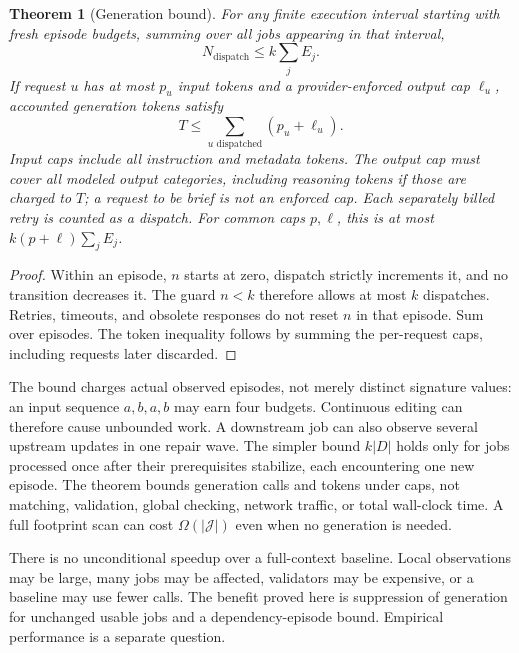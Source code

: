\documentclass[pdflatex,sn-mathphys-num]{sn-jnl}
\theoremstyle{thmstyleone}
\newtheorem{theorem}{Theorem}
\theoremstyle{thmstylethree}
\theoremstyle{thmstyletwo}
\newcommand{\Jobs}{\mathcal J}
\begin{document}
\begin{theorem}[Generation bound]\label{thm:cost}
For any finite execution interval starting with fresh episode budgets, summing over all jobs appearing in that interval,
\begin{equation}\label{eq:calls}
N_{\mathrm{dispatch}}\leq k\sum_j E_j.
\end{equation}
If request $u$ has at most $p_u$ input tokens and a provider-enforced output cap $\ell_u$, accounted generation tokens satisfy
\begin{equation}\label{eq:tokens}
T\leq\sum_{u\text{ dispatched}}(p_u+\ell_u).
\end{equation}
Input caps include all instruction and metadata tokens. The output cap must cover all modeled output categories, including reasoning tokens if those are charged to $T$; a request to be brief is not an enforced cap. Each separately billed retry is counted as a dispatch. For common caps $p,\ell$, this is at most $k(p+\ell)\sum_jE_j$.
\end{theorem}
\begin{proof}
Within an episode, $n$ starts at zero, dispatch strictly increments it, and no transition decreases it. The guard $n<k$ therefore allows at most $k$ dispatches. Retries, timeouts, and obsolete responses do not reset $n$ in that episode. Sum over episodes. The token inequality follows by summing the per-request caps, including requests later discarded.\qedhere
\end{proof}

The bound charges actual observed episodes, not merely distinct signature values: an input sequence $a,b,a,b$ may earn four budgets. Continuous editing can therefore cause unbounded work. A downstream job can also observe several upstream updates in one repair wave. The simpler bound $k|D|$ holds only for jobs processed once after their prerequisites stabilize, each encountering one new episode. The theorem bounds generation calls and tokens under caps, not matching, validation, global checking, network traffic, or total wall-clock time. A full footprint scan can cost $\Omega(|\Jobs|)$ even when no generation is needed.

There is no unconditional speedup over a full-context baseline. Local observations may be large, many jobs may be affected, validators may be expensive, or a baseline may use fewer calls. The benefit proved here is suppression of generation for unchanged usable jobs and a dependency-episode bound. Empirical performance is a separate question.
\end{document}
